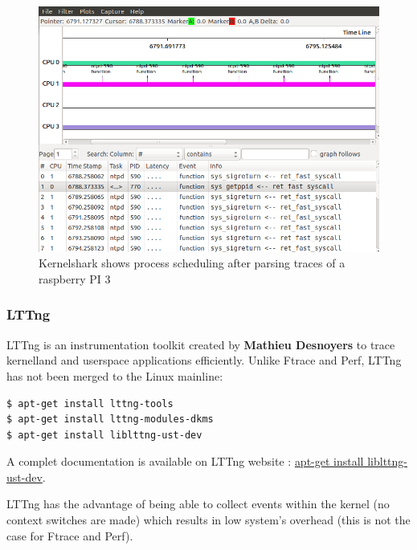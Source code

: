 \begin{itemize}
		\begin{figure}[H]
			\centering
        	\includegraphics[scale=0.40]{img/solution/kernelshark-task-schedule.png}
        	\caption{Kernelshark shows process scheduling after parsing traces of a raspberry PI 3}
        	\label{Kernelshark shows process scheduling after parsing traces of a raspberry PI 3}
    	\end{figure}




\end{itemize}


\subsubsection{LTTng}
LTTng is an instrumentation toolkit created by \textbf{Mathieu Desnoyers} to trace kernelland and userspace applications efficiently. Unlike Ftrace and Perf, LTTng has not been merged to the Linux mainline:

		\begin{lstlisting}[style=BashInputStyle]
$ apt-get install lttng-tools
$ apt-get install lttng-modules-dkms
$ apt-get install liblttng-ust-dev
	\end{lstlisting}	
	
A complet documentation is available on LTTng website : {\color{blue}\url{apt-get install liblttng-ust-dev}}.

LTTng has the advantage of being able to collect events within the kernel (no context switches are made) which results in low system's overhead (this is not the case for Ftrace and Perf).

